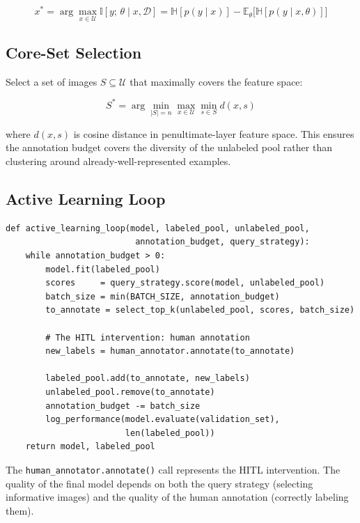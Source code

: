 \[
x^* = \arg\max_{x \in \mathcal{U}} \mathbb{I}[y;\, \theta \mid x, \mathcal{D}]
    = \mathbb{H}[p(y\mid x)] - \mathbb{E}_\theta\bigl[\mathbb{H}[p(y\mid x,\theta)]\bigr]
\]

\subsection{Core-Set Selection}

Select a set of images $S \subseteq \mathcal{U}$ that maximally covers the feature space:

\[
S^* = \arg\min_{|S|=n} \max_{x \in \mathcal{U}} \min_{s \in S} d(x, s)
\]

where $d(x,s)$ is cosine distance in penultimate-layer feature space. This ensures the annotation budget covers the diversity of the unlabeled pool rather than clustering around already-well-represented examples.

\subsection{Active Learning Loop}

\begin{lstlisting}[style=python, caption={Active learning loop for image annotation}]
def active_learning_loop(model, labeled_pool, unlabeled_pool,
                          annotation_budget, query_strategy):
    while annotation_budget > 0:
        model.fit(labeled_pool)
        scores     = query_strategy.score(model, unlabeled_pool)
        batch_size = min(BATCH_SIZE, annotation_budget)
        to_annotate = select_top_k(unlabeled_pool, scores, batch_size)

        # The HITL intervention: human annotation
        new_labels = human_annotator.annotate(to_annotate)

        labeled_pool.add(to_annotate, new_labels)
        unlabeled_pool.remove(to_annotate)
        annotation_budget -= batch_size
        log_performance(model.evaluate(validation_set),
                        len(labeled_pool))
    return model, labeled_pool
\end{lstlisting}

The \texttt{human\_annotator.annotate()} call represents the HITL intervention. The quality of the final model depends on both the query strategy (selecting informative images) and the quality of the human annotation (correctly labeling them).

